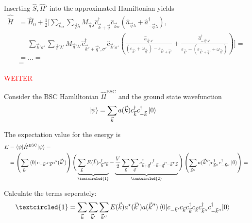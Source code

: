 \documentclass{article}
\newcommand{\lr}[1]{\left(#1\right)}
\begin{document}
{	Inserting $\hat{S}, \hat{H}'$ into the approximated Hamiltonian yields
		\begin{align*}
			\hat{\tilde{H}} &= \hat{H}_0 + \frac{1}{2} \Big[ \sum_{\vec{k}\sigma} \sum_{\vec{q}\lambda} M_{\vec{q}\lambda} \hat{c}_{\vec{k}+\vec{q}}^\dagger \hat{c}_{\vec{k}\sigma} \lr{ \hat{a}_{\vec{q}\lambda} + \hat{a}_{-\vec{q}\lambda}^\dagger },\\
			&\phantom{=} \sum_{\vec{k}'\sigma'}\sum_{\vec{q}'\lambda'} M_{\vec{q}'\lambda'} \hat{c}_{\vec{k}'+\vec{q}',\sigma'}^\dagger \hat{c}_{\vec{k}'\sigma'} \lr{ \frac{\hat{a}_{\vec{q}'\lambda'}}{(\varepsilon_{\vec{k}'} + \omega_{\vec{q}'}) - \varepsilon_{\vec{k}'+\vec{q}'}} + \frac{\hat{a}_{-\vec{q}'\lambda'}^\dagger}{\varepsilon_{\vec{k}'} - (\varepsilon_{\vec{k}'+\vec{q}'} + \omega_{\vec{q}'})} } \Big] = \\
			&= ... = \\
			&= 
		\end{align*}

	\textcolor{red}{WEITER}


	\dotfill

	Consider the BSC Hamliltonian $\hat{H}^\text{BSC}$ and the ground state wavefunction
		\begin{align*}
			\ket{\psi} &= \sum_{\vec{k}} a(\vec{k}) c_{\vec{k}}^\dagger c_{-\vec{k}}^\dagger \ket{0}
		\end{align*}
	
	The expectation value for the energy is
		\begin{align*}
			E &= \braket{ \psi | \hat{H}^\text{BSC} | \psi } = \\
			&= \lr{ \sum_{\vec{k}'} \bra{0} c_{-\vec{k}'} c_{\vec{k}} a^\star(\vec{k}') } \Bigg( \underbrace{ \sum_{\vec{k}} E(\vec{k}) c_{\vec{k}}^\dagger c_{\vec{k}}  }_{\textcircled{1}} - \underbrace{ \frac{V}{2} \sum_{\vec{k}} \sum_{\vec{q}} c_{\vec{k}+\vec{q}}^\dagger c_{-\vec{k}-\vec{q}}^\dagger c_{-\vec{k}} c_{\vec{k}}}_{\textcircled{2}} \Bigg) \lr{ \sum_{\vec{k}''} a(\vec{k}'') c_{\vec{k}''}^\dagger c_{-\vec{k}''}^\dagger \ket{0} } = \\
		\end{align*}
	
	Calculate the terms seperately:
		\begin{align*}
			\textcircled{1} &= \sum_{\vec{k}} \sum_{\vec{k}'} \sum_{\vec{k}''} E(\vec{k}) a^\star(\vec{k}') a(\vec{k}'') \braket{ 0 | c_{-\vec{k}'} c_{\vec{k}} c_{\vec{k}}^\dagger c_{\vec{k}} c_{\vec{k}''}^\dagger c_{-\vec{k}''}^\dagger | 0 }
		\end{align*}
	
}
\end{document}
